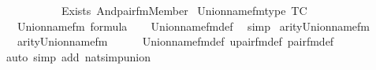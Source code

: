 \begin{isabellebody}
\ \ \ \ \ \ \ \ \ \ Exists\ {\isacharparenleft}{\kern0pt}And{\isacharparenleft}{\kern0pt}pair{\isacharunderscore}{\kern0pt}fm{\isacharparenleft}{\kern0pt}{}{\isacharcomma}{\kern0pt}{}{\isacharcomma}{\kern0pt}{}{\isacharparenright}{\kern0pt}{\isacharcomma}{\kern0pt}Member{\isacharparenleft}{\kern0pt}{}{\isacharcomma}{\kern0pt}{}{}{\isacharparenright}{\kern0pt}{\isacharparenright}{\kern0pt}{\isacharparenright}{\kern0pt}{\isacharparenright}{\kern0pt}{\isacharparenright}{\kern0pt}{\isacharparenright}{\kern0pt}{\isacharparenright}{\kern0pt}{\isacharparenright}{\kern0pt}{\isacharparenright}{\kern0pt}{\isacharparenright}{\kern0pt}{\isacharparenright}{\kern0pt}{\isacharparenright}{\kern0pt}{\isacharparenright}{\kern0pt}{\isacharparenright}{\kern0pt}{\isacharparenright}{\kern0pt}{\isacharparenright}{\kern0pt}{\isacharparenright}{\kern0pt}{\isachardoublequoteclose}\isanewline
\isanewline
{}\isamarkupfalse%
\ Union{\isacharunderscore}{\kern0pt}name{\isacharunderscore}{\kern0pt}fm{\isacharunderscore}{\kern0pt}type\ {\isacharbrackleft}{\kern0pt}TC{\isacharbrackright}{\kern0pt}{\isacharcolon}{\kern0pt}\isanewline
\ \ {\isachardoublequoteopen}Union{\isacharunderscore}{\kern0pt}name{\isacharunderscore}{\kern0pt}fm\ {\isasymin}formula{\isachardoublequoteclose}\isanewline
%
\isadelimproof
\ \ %
\endisadelimproof
%
\isatagproof
{}\isamarkupfalse%
\ Union{\isacharunderscore}{\kern0pt}name{\isacharunderscore}{\kern0pt}fm{\isacharunderscore}{\kern0pt}def\ \isamarkupfalse%
\ simp%
\endisatagproof
{\isafoldproof}%
%
\isadelimproof
\isanewline
%
\endisadelimproof
\isanewline
\isanewline
{}\isamarkupfalse%
\ arity{\isacharunderscore}{\kern0pt}Union{\isacharunderscore}{\kern0pt}name{\isacharunderscore}{\kern0pt}fm\ {\isacharcolon}{\kern0pt}\isanewline
\ \ {\isachardoublequoteopen}arity{\isacharparenleft}{\kern0pt}Union{\isacharunderscore}{\kern0pt}name{\isacharunderscore}{\kern0pt}fm{\isacharparenright}{\kern0pt}\ {\isacharequal}{\kern0pt}\ {}{\isachardoublequoteclose}\isanewline
%
\isadelimproof
\ \ %
\endisadelimproof
%
\isatagproof
{}\isamarkupfalse%
\ Union{\isacharunderscore}{\kern0pt}name{\isacharunderscore}{\kern0pt}fm{\isacharunderscore}{\kern0pt}def\ upair{\isacharunderscore}{\kern0pt}fm{\isacharunderscore}{\kern0pt}def\ pair{\isacharunderscore}{\kern0pt}fm{\isacharunderscore}{\kern0pt}def\isanewline
\ \ \isamarkupfalse%
{\isacharparenleft}{\kern0pt}auto\ simp\ add{\isacharcolon}{\kern0pt}\ nat{\isacharunderscore}{\kern0pt}simp{\isacharunderscore}{\kern0pt}union{\isacharparenright}{\kern0pt}%

\end{isabellebody}
